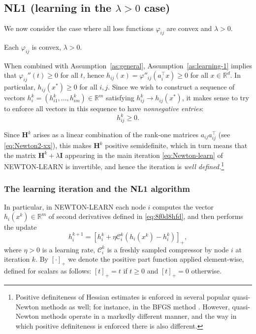 \documentclass[10pt]{article}
\newcommand{\R}{\mathbb{R}}
\newcommand{\newalpha}{h}
\newcommand{\mH}{\mathbf{H}}
\newcommand{\mI}{\mathbf{I}}
\newcommand{\cC}{{\mathcal{C}}}
\begin{document}
\subsection{{\sf NL1} (learning in the $\lambda > 0$ case)} \label{subsec:NL1}

We now consider  the case where all loss functions $\varphi_{ij}$ are convex and $\lambda >0$.
\begin{assumption}\label{as:learning-1}
Each $\varphi_{ij}$ is convex, $\lambda>0$.
\end{assumption}

When combined with  Assumption~\ref{as:general}, Assumption~\ref{as:learning-1} implies that $\varphi_{ij}''(t)\geq 0$ for all $t$, hence $h_{ij}(x) = \varphi''_{ij}(a_i^\top x)\geq 0$ for all $x\in \R^d$. In particular, $h_{ij}(x^*) \geq 0$ for all $i,j$. Since we wish to construct a sequence of vectors $h_i^k = (h_{i1}^k, \dots, h_{im}^k)\in \R^m$ satisfying $h_{ij}^k \to h_{ij}(x^*)$, it makes sense to try to enforce all vectors in this sequence to have {\em nonnegative entries}: $$h_{ij}^k\geq 0.$$

 Since  $\mH^k$ arises as a linear combination of the rank-one matrices $a_{ij}a_{ij}^\top$ (see \eqref{eq:Newton2-xx}), this makes  $\mH^k$ positive semidefinite, which in turn means that the matrix $\mH^k + \lambda \mI$ appearing in the main iteration \eqref{eq:Newton-learn} of {\sf NEWTON-LEARN} is invertible, and hence the iteration is {\em well defined.}\footnote{Positive definiteness of Hessian estimates is enforced in several popular quasi-Newton methods as well; for instance, in the BFGS method \cite{Broyden1967, Fletcher1970, Goldfarb1970, shanno1970conditioning}. However, quasi-Newton methods operate in a markedly different manner, and the way in which positive definiteness is enforced there is also different.} 
 
 
 
\subsubsection{The learning iteration and the {\sf NL1} algorithm}

 In particular, in {\sf NEWTON-LEARN} each node $i$  computes the vector $\newalpha_i(x^k)\in \R^m$  of second derivatives defined in \eqref{eq:8f0d8hfd}, and then performs the update
\begin{equation}\label{eq: big78fd_8h9fd}\boxed{\quad h^{k+1}_i = \left[h^k_i + \eta \cC_i^k(\newalpha_i(x^k) - h^k_i) \right]_+, \quad}\end{equation}
where $\eta>0$ is a learning rate, $\cC_i^k$ is a freshly sampled compressor by node $i$ at iteration $k$. By $[\cdot ]_+$ we denote the positive part function applied element-wise, defined for scalars as follows: $[t ]_+ = t$ if $t\geq 0$ and  $[t ]_+ = 0$ otherwise. 
\end{document}
